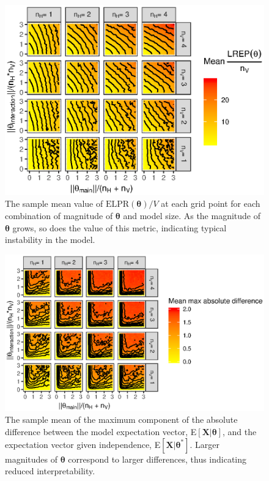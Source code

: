 \documentclass[12pt]{article}
\theoremstyle{definition}
\begin{document}
\begin{figure}
\includegraphics{paper_files/figure-latex/instab-plots-1} \caption{The sample mean value of $\text{ELPR}(\boldsymbol \theta)/V$ at each grid point for each combination of magnitude of $\boldsymbol \theta$ and model size. As the magnitude of $\boldsymbol \theta$ grows, so does the value of this metric, indicating typical instability in the model.}\label{fig:instab-plots}
\end{figure}
\begin{figure}
\includegraphics{paper_files/figure-latex/uninterp-plots-1} \caption{The sample mean of the maximum component of the absolute difference between the model expectation vector, E$\left[\boldsymbol X | \boldsymbol \theta\right]$, and the expectation vector given independence, E$\left[\boldsymbol X | \boldsymbol \theta^* \right ]$. Larger magnitudes of $\boldsymbol \theta$ correspond to larger differences, thus indicating reduced interpretability.}\label{fig:uninterp-plots}
\end{figure}
\end{document}
